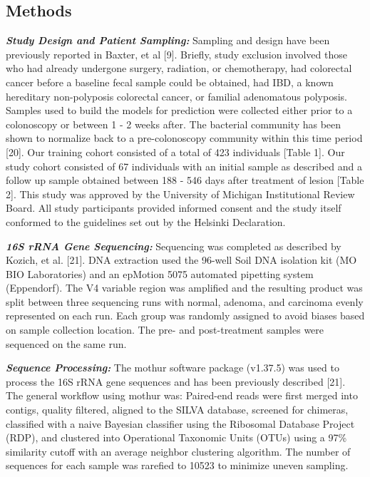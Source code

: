 \documentclass[12pt,]{article}
\begin{document}
\newpage

\subsection{Methods}\label{methods}

\textbf{\emph{Study Design and Patient Sampling:}} Sampling and design
have been previously reported in Baxter, et al {[}9{]}. Briefly, study
exclusion involved those who had already undergone surgery, radiation,
or chemotherapy, had colorectal cancer before a baseline fecal sample
could be obtained, had IBD, a known hereditary non-polyposis colorectal
cancer, or familial adenomatous polyposis. Samples used to build the
models for prediction were collected either prior to a colonoscopy or
between 1 - 2 weeks after. The bacterial community has been shown to
normalize back to a pre-colonoscopy community within this time period
{[}20{]}. Our training cohort consisted of a total of 423 individuals
{[}Table 1{]}. Our study cohort consisted of 67 individuals with an
initial sample as described and a follow up sample obtained between 188
- 546 days after treatment of lesion {[}Table 2{]}. This study was
approved by the University of Michigan Institutional Review Board. All
study participants provided informed consent and the study itself
conformed to the guidelines set out by the Helsinki Declaration.

\textbf{\emph{16S rRNA Gene Sequencing:}} Sequencing was completed as
described by Kozich, et al. {[}21{]}. DNA extraction used the 96-well
Soil DNA isolation kit (MO BIO Laboratories) and an epMotion 5075
automated pipetting system (Eppendorf). The V4 variable region was
amplified and the resulting product was split between three sequencing
runs with normal, adenoma, and carcinoma evenly represented on each run.
Each group was randomly assigned to avoid biases based on sample
collection location. The pre- and post-treatment samples were sequenced
on the same run.

\textbf{\emph{Sequence Processing:}} The mothur software package
(v1.37.5) was used to process the 16S rRNA gene sequences and has been
previously described {[}21{]}. The general workflow using mothur was:
Paired-end reads were first merged into contigs, quality filtered,
aligned to the SILVA database, screened for chimeras, classified with a
naive Bayesian classifier using the Ribosomal Database Project (RDP),
and clustered into Operational Taxonomic Units (OTUs) using a 97\%
similarity cutoff with an average neighbor clustering algorithm. The
number of sequences for each sample was rarefied to 10523 to minimize
uneven sampling.
\end{document}
